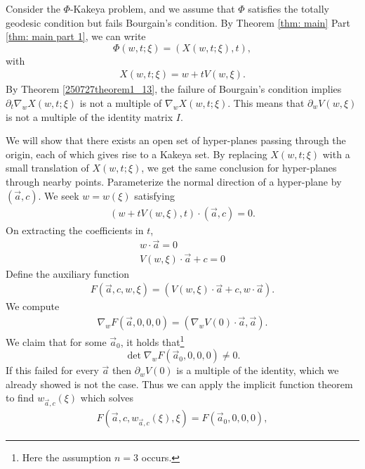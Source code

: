 \documentclass{article}
\numberwithin{equation}{section}
\theoremstyle{plain}
\begin{document}
Consider the $\Phi$-Kakeya problem, and we assume that $\Phi$ satisfies the totally geodesic condition but fails Bourgain's condition. 
By Theorem \ref{thm: main} Part \ref{thm: main part 1}, we can write 
\begin{equation}
\Phi(w, t; \xi)=(X(w, t; \xi), t),
\end{equation}
with 
\begin{align}
    X(w,t;\xi) = w + tV(w,\xi). 
\end{align}
By Theorem \ref{250727theorem1_13}, the failure of Bourgain's condition implies $\partial_t \nabla_w X(w,t;\xi)$ is not a multiple of $\nabla_w X(w,t;\xi)$. This means that $\partial_w V(w,\xi)$ is not a multiple of the identity matrix $I$.  

We will show that there exists an open set of hyper-planes passing through the origin, each of which gives rise to a Kakeya set. By replacing $X(w,t; \xi)$ with a small translation of $X(w, t; \xi)$, we get the same conclusion for hyper-planes through nearby points. 
Parameterize the normal direction of a hyper-plane by $(\vec a, c)$. We seek $w = w(\xi)$ satisfying 
\begin{align}\label{eq: pf of T.G. + fail Bourg -> worst}
    (w + tV(w,\xi), t) \cdot  (\vec a, c)= 0.
\end{align}
On extracting the coefficients in $t$,
\begin{align}
    w \cdot \vec{a} = 0 \\
     V(w,\xi) \cdot \vec{a} + c=0
\end{align}
Define the auxiliary function 
\begin{align}
    F(\vec a,c, w,\xi) = (V(w,\xi) \cdot \vec a + c, w \cdot \vec a).
\end{align}
We compute 
\begin{align}
    \nabla_w F(\vec a, 0,0,0) = (\nabla_w V(0)\cdot \vec a,\vec a).
\end{align}
We claim that for some $\vec a_0$, it holds that\footnote{Here the assumption  $n=3$ occurs. } 
\begin{equation}
\det \nabla_w F(\vec a_0, 0,0,0) \neq 0.
\end{equation}
 If this failed for every $\vec a$ then $\partial_w V(0)$ is a multiple of the identity, which we already showed is not the case. Thus we can apply the implicit function theorem to find $w_{\vec a,c}(\xi)$ which solves
\begin{align}
    F(\vec a,c, w_{\vec a, c}(\xi), \xi) = F(\vec a_0, 0,0,0),
\end{align}
\end{document}
